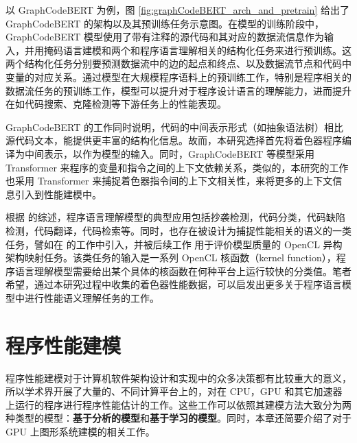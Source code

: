 以 GraphCodeBERT 为例，图 \ref{fig:graphCodeBERT_arch_and_pretrain} 给出了 GraphCodeBERT 的架构以及其预训练任务示意图。在模型的训练阶段中，GraphCodeBERT 模型使用了带有注释的源代码和其对应的数据流信息作为输入，并用掩码语言建模和两个和程序语言理解相关的结构化任务来进行预训练。这两个结构化任务分别要预测数据流中的边的起点和终点、以及数据流节点和代码中变量的对应关系。通过模型在大规模程序语料上的预训练工作，特别是程序相关的数据流任务的预训练工作，模型可以提升对于程序设计语言的理解能力，进而提升在如代码搜索、克隆检测等下游任务上的性能表现。

GraphCodeBERT {\amend 的工作同时说明}，代码的中间表示形式（如抽象语法树）相比源代码文本，能提供更丰富的结构化信息。故而，本研究选择首先将着色器程序编译为中间表示，以作为模型的输入。同时，GraphCodeBERT 等模型采用 Transformer 来程序的变量和指令之间的上下文依赖关系，类似的，本研究的工作也采用 Transformer 来捕捉着色器指令间的上下文相关性，来将更多的上下文信息引入到性能建模中。

根据 \citet{ijcai2022p775} 的综述，程序语言理解模型的典型应用包括抄袭检测，代码分类，代码缺陷检测，代码翻译，代码检索等。同时，也存在被设计为捕捉性能相关的语义的一类任务，譬如在 \citet{8091247} 的工作中引入，并被后续工作 \cite{pmlr-v139-peng21b, pmlr-v139-cummins21a} 用于评价模型质量的 OpenCL 异构架构映射任务。该类任务的输入是一系列 OpenCL 核函数（kernel function），程序语言理解模型需要给出某个具体的核函数在何种平台上运行较快的分类值。笔者希望，通过本研究过程中收集的着色器性能数据，可以启发出更多关于程序语言模型中进行性能语义理解任务的工作。

\section{程序性能建模}

程序性能建模对于计算机软件架构设计和实现中的众多决策都有比较重大的意义，所以学术界开展了大量的、不同计算平台上的，对在 CPU，GPU 和其它加速器上运行的程序进行程序性能估计的工作。这些工作可以依照其建模方法大致分为两种类型的模型：\textbf{基于分析的模型}和\textbf{基于学习的模型}。同时，本章还简要介绍了对于 GPU 上图形系统建模的相关工作。



